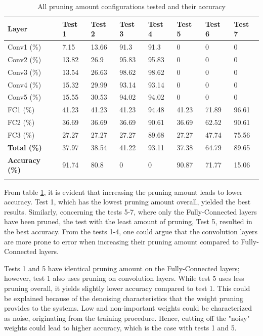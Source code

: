 \begin{table}[H]
	\caption{All pruning amount configurations tested and their accuracy}
	\label{tab:pruning-amount-vs-accuracy}
	\centering
	\begin{tabular}{llll llll}
		\toprule
		\textbf{Layer} & \textbf{Test 1} & \textbf{Test 2} & \textbf{Test 3} & \textbf{Test 4} & \textbf{Test 5} & \textbf{Test 6} & \textbf{Test 7}\\
		\midrule
			Conv1 (\%) & 7.15 & 13.66 & 91.3 & 91.3 & 0 & 0 & 0 \\
			Conv2 (\%) & 13.82 & 26.9 & 95.83 & 95.83 & 0 & 0 & 0 \\
			Conv3 (\%) & 13.54 & 26.63 & 98.62 & 98.62 & 0 & 0 & 0 \\
			Conv4 (\%) & 15.32 & 29.99 & 93.14 & 93.14 & 0 & 0 & 0 \\
			Conv5 (\%) & 15.55 & 30.53 & 94.02 & 94.02 & 0 & 0 & 0 \\
			FC1 (\%) & 41.23 & 41.23 & 41.23 & 94.48 & 41.23 & 71.89 & 96.61 \\
			FC2 (\%) & 36.69 & 36.69 & 36.69 & 90.61 & 36.69 & 62.52 & 90.61 \\
			FC3 (\%) & 27.27 & 27.27 & 27.27 & 89.68 & 27.27 & 47.74 & 75.56 \\
			\midrule
			\textbf{Total (\%)} & 37.97	& 38.54 & 41.22 & 93.11 & 37.38 & 64.79 & 89.65 \\
			\midrule
			\textbf{Accuracy (\%)} & 91.74	& 80.8 & 0 & 0 & 90.87 & 71.77 & 15.06 \\
		\bottomrule\\
	\end{tabular}
\end{table}

From table \ref{tab:pruning-amount-vs-accuracy}, it is evident that increasing the pruning amount leads to lower accuracy. Test 1, which has the lowest pruning amount overall, yielded the best results. Similarly, concerning the tests 5-7, where only the Fully-Connected layers have been pruned, the test with the least amount of pruning, Test 5, resulted in the best accuracy. From the tests 1-4, one could argue that the convolution layers are more prone to error when increasing their pruning amount compared to Fully-Connected layers.

Tests 1 and 5 have identical pruning amount on the Fully-Connected layers; however, test 1 also uses pruning on convolution layers. While test 5 uses less pruning overall, it yields slightly lower accuracy compared to test 1. This could be explained because of the denoising characteristics that the weight pruning provides to the systems. Low and non-important weights could be characterized as noise, originating from the training procedure. Hence, cutting off the "noisy" weights could lead to higher accuracy, which is the case with tests 1 and 5.

